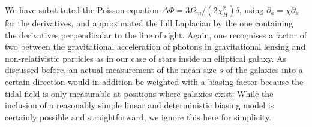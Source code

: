 \documentclass[a4paper,fleqn,usenatbib]{mnras}
\begin{document}
We have substituted the Poisson-equation $\Delta\Phi = 3\Omega_m/(2\chi_H^2)\delta$, using $\partial_a = \chi\partial_x$ for the derivatives, and approximated the full Laplacian by the one containing the derivatives perpendicular to the line of sight. Again, one recognises a factor of two between the gravitational acceleration of photons in gravitational lensing and non-relativistic particles as in our case of stars inside an elliptical galaxy. As discussed before, an actual measurement of the mean size $s$ of the galaxies into a certain direction would in addition be weighted with a biasing factor because the tidal field is only measurable at positions where galaxies exist: While the inclusion of a reasonably simple linear and deterministic biasing model is certainly possible and straightforward, we ignore this here for simplicity. 
\end{document}
